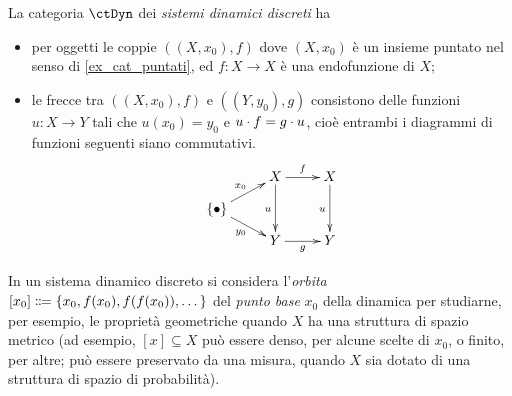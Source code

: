 \begin{example}\label{ex_cat_dyn}
 La categoria \(\ctDyn\) dei \emph{sistemi dinamici discreti} ha
 \begin{itemize}
  \item per oggetti le coppie \(((X,x_0),f)\) dove \((X,x_0)\) è un insieme puntato nel senso di \ref{ex_cat_puntati}, ed \(f \colon X\to X\) è una endofunzione di \(X\);
  \item  le frecce tra \(((X,x_0),f)\) e \(((Y,y_0),g)\) consistono delle funzioni \(u \colon X \to Y\) tali che \(u(x_0)=y_0\) e \(u\cdot f = g\cdot u\), cioè entrambi i diagrammi di funzioni seguenti siano commutativi.
        \[\xymatrix@R=3mm{
         & X\ar[r]^f\ar[dd]_u & X \ar[dd]_u\\
         \singleton\ar[ur]^{x_0}\ar[dr]_{y_0} &&\\
         & Y \ar[r]_g & Y
         }\]
 \end{itemize}
 In un sistema dinamico discreto si considera l'\emph{orbita} \([x_0]\defeq \{x_0,f(x_0),f(f(x_0)),\dots\}\) del \emph{punto base} \(x_0\) della dinamica per studiarne, per esempio, le proprietà geometriche quando \(X\) ha una struttura di spazio metrico (ad esempio, \([x]\subseteq X\) può essere denso, per alcune scelte di \(x_0\), o finito, per altre; può essere preservato da una misura, quando \(X\) sia dotato di una struttura di spazio di probabilità).
\end{example}
